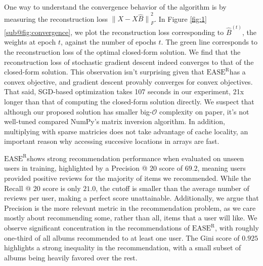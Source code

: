 \documentclass{article}
\newcommand{\easer}{$\text{EASE}^\text{R}$}
\newcommand{\norm}[1]{\ensuremath{\lVert #1 \rVert}}
\begin{document}
One way to understand the convergence behavior of the algorithm is by measuring
 the reconstruction loss $\norm{X - X \hat{B}}_F^2$.
In Figure \ref{fig:1}\ref{sub@fig:convergence}, we plot the reconstruction loss
 corresponding to $\hat{B}^{(t)}$, the weights at epoch $t$, against the number
 of epochs $t$.
The green line corresponds to the reconstruction loss of the optimal
 closed-form solution.
We find that the reconstruction loss of stochastic gradient descent indeed
 converges to that of the closed-form solution.
This observation isn't surprising given that \easer has a convex objective, and
 gradient descent provably converges for convex objectives.
That said, SGD-based optimization takes 107 seconds in our experiment, 21x
 longer than that of computing the closed-form solution directly.
We suspect that although our proposed solution has smaller big-$\mathcal{O}$
 complexity on paper, it's not well-tuned compared  NumPy's matrix inversion
 algorithm.
In addition, multiplying with sparse matricies does not take advantage of cache
 locality, an important reason why accessing succesive locations in arrays are
 fast.

\easer shows strong recommendation performance when evaluated on unseen users
in training, highlighted by a Precision @ $20$ score of $69.2$, meaning users
provided
positive reviews for the majority of items we recommended.
While the Recall @ $20$ score is only $21.0$, the cutoff is smaller than the
 average number of reviews per user, making a perfect score unattainable.
Additionally, we argue that Precision is the more relevant metric in the
 recommendation problem, as we care mostly about recommending some, rather than
 all, items that a user will like.
We observe significant concentration in the recommendations of \easer, with
 roughly one-third of all albums recommended to at least one user.
The Gini score of $0.925$ highlights a strong inequality in the recommendation,
 with a small subset of albums being heavily favored over the rest.
\end{document}
